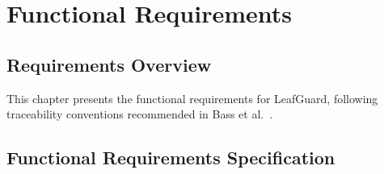 \documentclass[11pt,a4paper,oneside]{report}
\begin{document}
\chapter{Functional Requirements}

\section{Requirements Overview}

This chapter presents the functional requirements for LeafGuard, following traceability conventions recommended in Bass et al.~\cite{bass2024}.

\section{Functional Requirements Specification}
\end{document}
